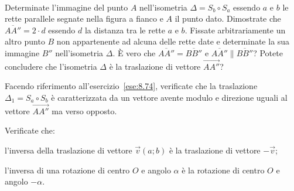 \begin{esercizio}
\label{ese:}
~

\noindent\begin{minipage}{.70\textwidth}
Determinate l'immagine del punto \(A\) nell'isometria \(\Delta=S_b \circ 
S_a\) essendo \(a\) e \(b\) le rette parallele segnate nella figura a 
fianco e \(A\) il punto dato. Dimostrate che \(\overline{AA''}=2\cdot d\) 
essendo \(d\) la distanza tra le rette \(a\) e \(b\).
Fissate arbitrariamente un altro punto \(B\) non appartenente ad alcuna 
delle rette date e determinate la sua immagine \(B''\) nell'isometria 
\(\Delta\).
\`E vero che \(\overline{AA''}=\overline{BB''}\) e \(\overline{AA''} 
\parallel \overline{BB''}\)? Potete concludere che l'isometria 
\(\Delta\) è la traslazione di vettore \(\overrightarrow{AA''}\)?
\end{minipage} 
\begin{minipage}{.28\textwidth}
\begin{inaccessibleblock}
\begin{center}  \end{center}
\end{inaccessibleblock}
\end{minipage}
\end{esercizio}

% 

\begin{esercizio}
\label{ese:8.75} %
Facendo riferimento all'esercizio~\ref{ese:8.74}, verificate che la 
traslazione \(\Delta_1 = S_a \circ S_b\) è caratterizzata da un vettore 
avente modulo e direzione uguali al vettore \(\overrightarrow{AA''}\) 
ma verso opposto.
\end{esercizio}

\begin{esercizio}
\label{ese:8.82} %
Verificate che:
\begin{enumeratea}
\item l'inversa della traslazione di vettore \(\vec{v}(a;b)\) è la 
traslazione di vettore \(-\vec{v}\);
\item l'inversa di una rotazione di centro \(O\) e angolo \(\alpha\) è la 
rotazione di centro \(O\) e angolo \(-\alpha\).
\end{enumeratea}
\end{esercizio}

